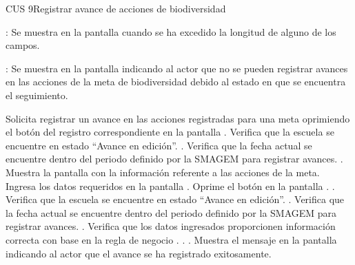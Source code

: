 \begin{UseCase}{CUS 9}{Registrar avance de acciones de biodiversidad}
{\begin{UClist}
        \UCli {}: Se muestra en la pantalla  cuando se ha excedido la longitud de alguno de los campos.    
        
        \UCli {}: Se muestra en la pantalla  indicando al actor que no se pueden registrar avances en las acciones de la meta de biodiversidad debido al estado en que se encuentra el seguimiento.
    \end{UClist}
    }

    


\end{UseCase}


\begin{UCtrayectoria}
    \UCpaso[\UCactor] Solicita registrar un avance en las acciones registradas para una meta oprimiendo el botón \botAutoAjus del registro correspondiente en la pantalla .
    \UCpaso[\UCsist] Verifica que la escuela se encuentre en estado ``Avance en edición''. .
    \UCpaso[\UCsist] Verifica que la fecha actual se encuentre dentro del periodo definido por la SMAGEM para registrar avances. .
    \UCpaso[\UCsist] Muestra la pantalla  con la información referente a las acciones de la meta. 
    \UCpaso[\UCactor] Ingresa los datos requeridos en la pantalla . \label{cus9:RegAvance}
    \UCpaso[\UCactor] Oprime el botón  en la pantalla . .
    \UCpaso[\UCsist] Verifica que la escuela se encuentre en estado ``Avance en edición''. .
    \UCpaso[\UCsist] Verifica que la fecha actual se encuentre dentro del periodo definido por la SMAGEM para registrar avances. .
    \UCpaso[\UCsist] Verifica que los datos ingresados proporcionen información correcta con base en la regla de negocio . . .  
    \UCpaso[\UCsist] Muestra el mensaje  en la pantalla  indicando al actor que el avance se ha registrado exitosamente.
\end{UCtrayectoria}
 
